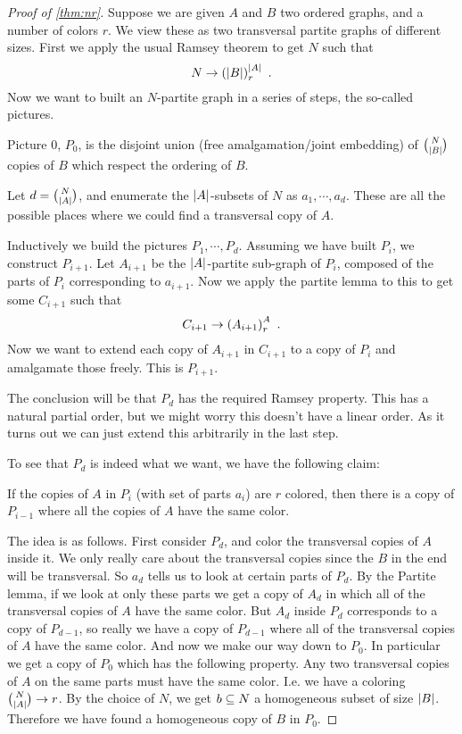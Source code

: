 \documentclass{amsart}
\begin{document}
\begin{proof}[Proof of \cref{thm:nr}]
Suppose we are given $A$ and $B$ two ordered graphs, and a number of colors $r$. We view
these as two transversal partite graphs of different sizes.
First we apply the usual Ramsey theorem to get $N$ such that
\begin{equation}
N\rightarrow \left( \left| B \right| \right)^{\left| A \right|}_r \ .
\end{equation}
Now we want to built an $N$-partite graph in a series of steps, the so-called pictures.

Picture $0$, $P_0$, is the disjoint union (free amalgamation/joint embedding) of
$\binom{N}{\left| B \right|}$ copies of $B$ which respect the ordering of $B$.

Let $d = \binom{N}{\left| A \right|}$, and enumerate the $\left| A \right|$-subsets of $N$ as $a_1 , \cdots
, a_d$. These are all the possible places where we could find a transversal copy of $A$.

Inductively we build the pictures $P_1 , \cdots , P_d$.
Assuming we have built $P_i$, we construct $P_{i+1}$. Let $A_{i+1}$ be the
$\left| A \right|$-partite sub-graph of $P_i$, composed of the parts of $P_i$ corresponding to $a_{i+1}$.
Now we apply the partite lemma to this to get some $C_{i+1}$ such that
\begin{equation}
C_{i+1} \rightarrow \left( A_{i+1} \right)_r^A\ . 
\end{equation}
Now we want to extend each copy of $A_{i+1}$ in $C_{i+1}$ to a copy of $P_i$ and
amalgamate those freely. This is $P_{i+1}$.

The conclusion will be that $P_d$ has the required Ramsey property.
This has a natural partial order, but we might worry this doesn't have a linear order. 
As it turns out we can just extend this arbitrarily in the last step. 

To see that $P_d$ is indeed what we want, we have the following claim:

\begin{clm}
If the copies of $A$ in $P_i$ (with set of parts $a_i$) are $r$ colored, then there is a copy
of $P_{i-1}$ where all the copies of $A$ have the same color.
\end{clm}

The idea is as follows. First consider $P_d$, and color the transversal copies of $A$
inside it.
We only really care about the transversal copies since the $B$ in the end will be
transversal. 
So $a_d$ tells us to look at certain parts of $P_d$. By the Partite lemma, if
we look at only these parts we get a copy of $A_d$ in which all of the transversal
copies of $A$ have the same color. But $A_d$ inside $P_d$ corresponds to a copy of $P_{d-1}$,
so really we have a copy of $P_{d-1}$ where all of the transversal copies of $A$ have the
same color. And now we make our way down to $P_0$.
In particular we get a copy of $P_0$ which has the following property. Any two transversal
copies of $A$ on the same parts must have the same color.
I.e. we have a coloring $\binom{N}{\left| A \right|}\rightarrow r$. By the choice of $N$, we get
$b\subseteq N$ a homogeneous subset of size $\left| B \right|$. 
Therefore we have found a homogeneous copy of $B$ in $P_0$.
\end{proof}
\end{document}
